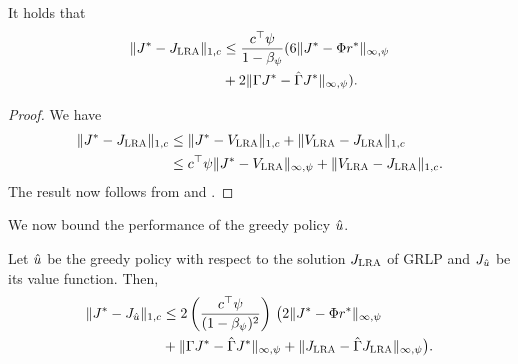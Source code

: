 \documentclass[twocolumn]{IEEEtran}
\begin{document}
\begin{theorem}
\label{cmt2mn}
It holds that
\begin{align}\label{finalbndmn}
\begin{split}
\norm{J^*-\hj}_{1,c}
&\leq\frac{c^\top\psi}{1-\beta_\psi}(6 \norm{J^*-\Phi r^*}_{\mn}\\
&+2\norm{\Gamma J^*-\hg J^*}_{\mn}).
\end{split}
\end{align}
\end{theorem}
\begin{proof}
We have
\begin{align}
\|J^*-J_{\text{\sc LRA}}\|_{1,c}\nonumber
&\leq\|J^*-V_{\text{\sc LRA}}\|_{1,c}+\|V_{\text{\sc LRA}}-J_{\text{\sc LRA}}\|_{1,c}\nonumber\\
&\leq c^\top \psi \|J^*-V_{\text{\sc LRA}}\|_{\infty,\psi}+\|V_{\text{\sc LRA}}-J_{\text{\sc LRA}}\|_{1,c}.\nonumber
\end{align}
The result now follows from  and .
\end{proof}
\fi
{}
We now bound the performance of the greedy policy $\hat{u}$.
\begin{theorem}
\label{polthe}
Let $\hat{u}$ be the greedy policy with respect to the solution $J_{\text{\sc LRA}}$ of GRLP and $J_{\hat{u}}$ be its value function.
Then,
\begin{align}\label{polthebnd}
\norm{J^* - J_{\hu}}_{1,c}
&\leq 2\left(\frac{c^\top \psi}{(1-\beta_{\psi})^2}\right)\, \big( 2\norm{J^*-\Phi r^*}_{\mn}
\nn\\&
+\norm{\Gamma J^*-\hg J^*}_{\mn}+\norm{\hj-\hg\hj}_{\mn}\big).
\end{align}
\end{theorem}
\end{document}

